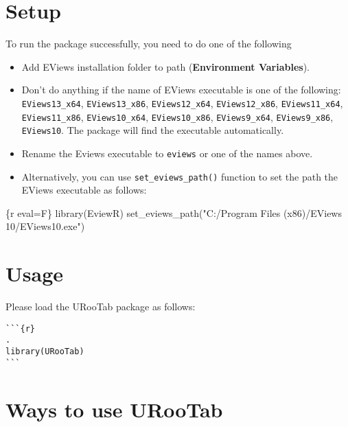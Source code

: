 \documentclass[
  letterpaper,
  DIV=11,
  numbers=noendperiod]{scrartcl}
\newenvironment{Shaded}{\begin{snugshade}}{\end{snugshade}}
\newcommand{\FunctionTok}[1]{\textcolor[rgb]{0.28,0.35,0.67}{#1}}
\newcommand{\InformationTok}[1]{\textcolor[rgb]{0.37,0.37,0.37}{#1}}
\newcommand{\NormalTok}[1]{\textcolor[rgb]{0.00,0.23,0.31}{#1}}
\newcommand{\StringTok}[1]{\textcolor[rgb]{0.13,0.47,0.30}{#1}}
\begin{document}
\hypertarget{setup}{%
\section{Setup}\label{setup}}

To run the package successfully, you need to do one of the following

\begin{itemize}
\item
  Add EViews installation folder to path (\textbf{Environment
  Variables}).
\item
  Don't do anything if the name of EViews executable is one of the
  following: \texttt{EViews13\_x64}, \texttt{EViews13\_x86},
  \texttt{EViews12\_x64}, \texttt{EViews12\_x86},
  \texttt{EViews11\_x64}, \texttt{EViews11\_x86},
  \texttt{EViews10\_x64}, \texttt{EViews10\_x86}, \texttt{EViews9\_x64},
  \texttt{EViews9\_x86}, \texttt{EViews10}. The package will find the
  executable automatically.
\item
  Rename the Eviews executable to \texttt{eviews} or one of the names
  above.
\item
  Alternatively, you can use \texttt{set\_eviews\_path()} function to
  set the path the EViews executable as follows:
\end{itemize}

\begin{Shaded}
\begin{Highlighting}[]
\InformationTok{\textasciigrave{}\textasciigrave{}\textasciigrave{}\{r eval=F\}}
\FunctionTok{library}\NormalTok{(EviewR)}
\FunctionTok{set\_eviews\_path}\NormalTok{(}\StringTok{"C:/Program Files (x86)/EViews 10/EViews10.exe"}\NormalTok{)}
\InformationTok{\textasciigrave{}\textasciigrave{}\textasciigrave{}}
\end{Highlighting}
\end{Shaded}

\hypertarget{usage}{%
\section{Usage}\label{usage}}

Please load the URooTab package as follows:

\begin{verbatim}
```{r}                                                                .
library(URooTab)
```
\end{verbatim}

\hypertarget{ways-to-use-urootab}{%
\section{Ways to use URooTab}\label{ways-to-use-urootab}}
\end{document}
